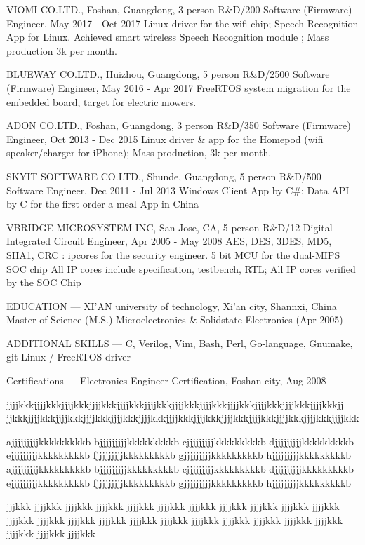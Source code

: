 VIOMI CO.LTD., Foshan, Guangdong, 3 person R\&D/200
Software (Firmware) Engineer, May 2017 - Oct 2017
 Linux driver for the wifi chip; Speech Recognition App for Linux.
 Achieved smart wireless Speech Recognition module ; Mass production 3k per month.

BLUEWAY CO.LTD., Huizhou, Guangdong, 5 person R\&D/2500
Software (Firmware) Engineer, May 2016 - Apr 2017
 FreeRTOS system migration for the embedded board, target for electric mowers.

ADON CO.LTD., Foshan, Guangdong, 3 person R\&D/350
Software (Firmware) Engineer, Oct 2013 - Dec 2015
 Linux driver \& app for the Homepod (wifi speaker/charger for iPhone); Mass production, 3k per month.

SKYIT SOFTWARE CO.LTD., Shunde, Guangdong, 5 person R\&D/500
Software Engineer, Dec 2011 - Jul 2013
 Windows Client App by C\#; Data API by C for the first order a meal App in China

VBRIDGE MICROSYSTEM INC, San Jose, CA, 5 person R\&D/12
Digital Integrated Circuit Engineer, Apr 2005 - May 2008
 AES, DES, 3DES, MD5, SHA1, CRC : ipcores for the security engineer. 
 5 bit MCU for the dual-MIPS SOC chip
 All IP cores include specification, testbench, RTL; All IP cores verified by the SOC Chip

EDUCATION
---
XI'AN university of technology, Xi'an city, Shannxi, China
Master of Science (M.S.) Microelectronics \& Solidstate Electronics (Apr 2005)

ADDITIONAL SKILLS
---
 C, Verilog, Vim, Bash, Perl, Go-language, Gnumake, git
 Linux / FreeRTOS driver

Certifications
---
Electronics Engineer Certification, Foshan city, Aug 2008

jjjjkkkjjjjkkkjjjjkkkjjjjkkkjjjjkkkjjjjkkkjjjjkkkjjjjkkkjjjjkkkjjjjkkkjjjjkkkjjjjkkkjj
jjkkkjjjjkkkjjjjkkkjjjjkkkjjjjkkkjjjjkkkjjjjkkkjjjjkkkjjjjkkkjjjjkkkjjjjkkkjjjjkkkjjjjkkk

ajjjjjjjjjkkkkkkkkkb
bjjjjjjjjjkkkkkkkkkb
cjjjjjjjjjkkkkkkkkkb
djjjjjjjjjkkkkkkkkkb
ejjjjjjjjjkkkkkkkkkb
fjjjjjjjjjkkkkkkkkkb
gjjjjjjjjjkkkkkkkkkb
hjjjjjjjjjkkkkkkkkkb
ajjjjjjjjjkkkkkkkkkb
bjjjjjjjjjkkkkkkkkkb
cjjjjjjjjjkkkkkkkkkb
djjjjjjjjjkkkkkkkkkb
ejjjjjjjjjkkkkkkkkkb
fjjjjjjjjjkkkkkkkkkb
gjjjjjjjjjkkkkkkkkkb
hjjjjjjjjjkkkkkkkkkb

jjjkkk jjjjkkk jjjjkkk jjjjkkk jjjjkkk jjjjkkk jjjjkkk jjjjkkk jjjjkkk jjjjkkk jjjjkkk jjjjkkk jjjjkkk jjjjkkk jjjjkkk jjjjkkk jjjjkkk jjjjkkk jjjjkkk jjjjkkk jjjjkkk jjjjkkk jjjjkkk jjjjkkk jjjjkkk

